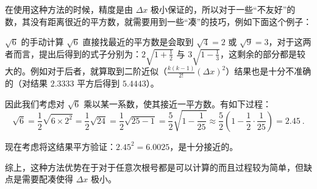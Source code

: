 在使用这种方法的时候，精度是由 $\Delta x$ 极小保证的，所以对于一些“不友好”的数，其没有距离很近的平方数，就需要用到一些“凑”的技巧，例如下面这个例子：
\begin{example}{$\sqrt{6}$ 的手动计算}
$\sqrt{6}$ 直接找最近的平方数是会取到 $\sqrt{4}=2$ 或 $\sqrt{9}=3$，对于这两者而言，提出后得到的式子分别为：$2\sqrt{1 + \frac 12}$ 与 $3 \sqrt{1 - \frac 13}$，这剩余的部分都是较大的。例如对于后者，就算取到二阶近似（$\frac{k(k-1)}{2!} (\Delta x)^2$）结果也是十分不准确的（对结果 $2.3333$ 平方后得到 $5.4443$）。

因此我们考虑对 $\sqrt{6}$ 乘以某一系数，使其接近一平方数。有如下过程：
$$\sqrt{6} = \frac 12 \sqrt{6 \times 2^2} = \frac 12 \sqrt{24} = \frac 12 \sqrt{25 - 1} = \frac52 \sqrt{1 - \frac 1{25}} \approx \frac 52 \left(1 - \frac 12 \cdot \frac 1{25}\right) = 2.45~.$$

现在考虑将这结果平方验证：$2.45^2 = 6.0025$，是十分接近的。
\end{example}

综上，这种方法优势在于对于任意次根号都是可以计算的而且过程较为简单，但缺点是需要配凑使得 $\Delta x$ 极小。